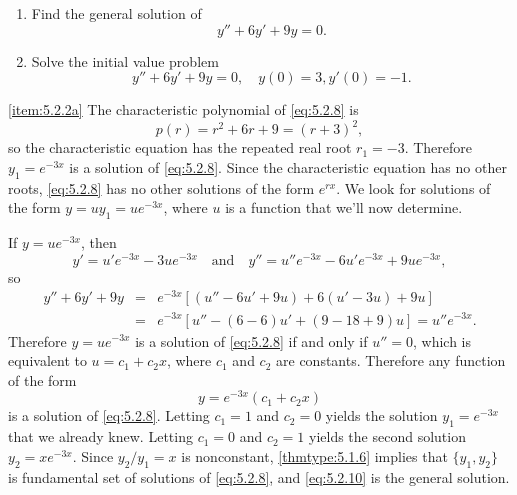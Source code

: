 \documentclass{ximera}
\begin{document}
\begin{example}\label{example:5.2.2}
\begin{enumerate}
\item\label{item:5.2.2a}%
Find the general solution of
\begin{equation} \label{eq:5.2.8}
y''+6y'+9y=0.
\end{equation}
 
\item\label{item:5.2.2b}%
Solve the initial value problem
\begin{equation} \label{eq:5.2.9}
y''+6y'+9y=0, \quad   y(0)=3,  y'(0)=-1.
\end{equation}
\end{enumerate}
 
\begin{explanation}
\ref{item:5.2.2a}  The characteristic polynomial of
 \eqref{eq:5.2.8} is
$$
p(r)=r^2+6r+9=(r+3)^2,
$$
so the characteristic equation has the repeated real root $r_1=-3$.
Therefore $y_1=e^{-3x}$ is a solution of \eqref{eq:5.2.8}. Since the
characteristic equation has no other roots, \eqref{eq:5.2.8}
has no other  solutions of the form $e^{rx}$.
 We  look for  solutions of the form
$y=uy_1=ue^{-3x}$,
where $u$ is a function that we'll now
determine.
 
If $y=ue^{-3x}$, then
$$
y'=u'e^{-3x}-3ue^{-3x}\quad\mbox{and}\quad
y''=u''e^{-3x}-6u'e^{-3x}+9ue^{-3x},
$$
so
\begin{eqnarray*}
y''+6y'+9y&=&e^{-3x}\left[(u''-6u'+9u)+6(u'-3u)+9u\right]\\
&=&e^{-3x}\left[u''-(6-6)u'+(9-18+9)u\right]=u''e^{-3x}.
\end{eqnarray*}
Therefore $y=ue^{-3x}$ is a solution of \eqref{eq:5.2.8} if and only if
$u''=0$, which is equivalent to $u=c_1+c_2x$, where $c_1$ and $c_2$
are constants. Therefore any function of the form
\begin{equation} \label{eq:5.2.10}
y=e^{-3x}(c_1+c_2x)
\end{equation}
is  a solution of \eqref{eq:5.2.8}.
Letting $c_1=1$ and $c_2=0$  yields the solution
 $y_1=e^{-3x}$ that we already knew. Letting $c_1=0$ and $c_2=1$
yields the second solution $y_2=xe^{-3x}$. Since
$y_2/y_1=x$
is nonconstant, \ref{thmtype:5.1.6} implies that   $\{y_1,y_2\}$ is
fundamental set of solutions of \eqref{eq:5.2.8}, and \eqref{eq:5.2.10}
is the general solution.
 

\end{explanation}
\end{example}
\end{document}
